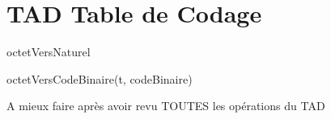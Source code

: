 \section{TAD Table de Codage}

\begin{tad}
    \begin{tadOperations}{octetVersNaturel}
       
       
    \end{tadOperations}

    \begin{tadPreconditions}{octetVersCodeBinaire(t, codeBinaire)}
    \end{tadPreconditions}

    \begin{tadAxiomes}{}
        A mieux faire 	après avoir revu TOUTES les opérations du TAD
    \end{tadAxiomes}

\end{tad}
